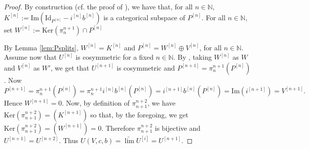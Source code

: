 \documentclass[english]{amsart}
\numberwithin{equation}{section}
\numberwithin{figure}{section}
\theoremstyle{plain}
\theoremstyle{definition}
\theoremstyle{definition}
\theoremstyle{remark}
\theoremstyle{remark}
\theoremstyle{plain}
\theoremstyle{plain}
\theoremstyle{plain}
\begin{document}
\begin{proof}
By construction (cf. the proof of \cite[Proposition 4.5]{Ardizzoni-MMPrim}), we have that, for all $n\in\mathbb{N}$, $K^{[n]}:=\mathrm{Im}\left(\mathrm{Id}_{P^{\left[n\right]}}-i^{\left[n\right]}b^{\left[n\right]}\right)$ is a categorical subspace of $P^{\left[n\right]}$. For all $n\in\mathbb{N}$, set $W^{\left[n\right]}:=\mathrm{Ker}\left(\pi_{n}^{n+1}\right)\cap P^{\left[n\right]}$

By Lemma \ref{lem:Psplits}, $W^{\left[n\right]}=K^{[n]}$ and $P^{\left[n\right]}=W^{\left[n\right]}\oplus V^{\left[n\right]}$, for all  $n\in\mathbb{N}$. Assume now that $U^{\left[n\right]}$ is
cosymmetric for a fixed $n\in\mathbb{N}$.  By \cite[Lemmata 4.2 and 4.4]{Kharchenko- connected}, taking $W^{\left[n\right]}$ as $W$ and $V^{\left[n\right]}$ as $W'$,
we get that $U^{\left[n+1\right]}$ is cosymmetric and $P^{\left[n+1\right]}=\pi_{n}^{n+1}(P^{\left[n\right]})$.
Now\[
P^{\left[n+1\right]}=\pi_{n}^{n+1}(P^{\left[n\right]}) =\pi_{n}^{n+1}i^{\left[n\right]}b^{\left[n\right]}(P^{\left[n\right]}) =i^{\left[n+1\right]}b^{\left[n\right]}(P^{\left[n\right]}) =\mathrm{Im}(i^{\left[n+1\right]})=V^{\left[n+1\right]}.\]
Hence $W^{\left[n+1\right]}=0$. Now, by definition of $\pi_{n+1}^{n+2}$, we have  $\mathrm{Ker}\left(\pi_{n+1}^{n+2}\right)=\left(K^{[n+1]}\right)$ so that, by the foregoing, we get $\mathrm{Ker}\left(\pi_{n+1}^{n+2}\right)=\left(W^{\left[n+1\right]}\right)=0$. Therefore $\pi_{n+1}^{n+2}$ is bijective and $U^{\left[n+1\right]}=U^{\left[n+2\right]}$.
Thus $U\left(V,c,b\right)=\underrightarrow{\lim}U^{\left[i\right]}=U^{\left[n+1\right]}$.\end{proof}
\end{document}
